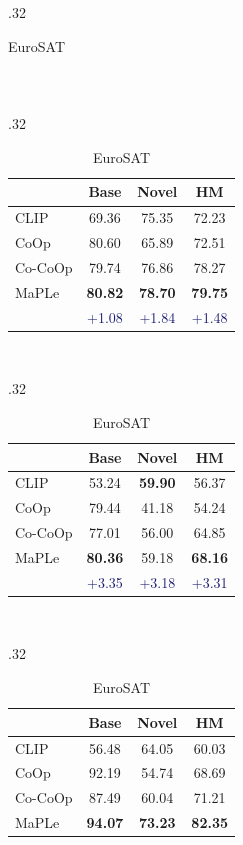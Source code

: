 \documentclass[10pt,twocolumn,letterpaper]{article}
\begin{document}
\begin{table}[t!]
\begin{subtable}[t]{.32\textwidth}
\begin{tabular}{l cc|c}
    \end{tabular}
    \end{subtable}
    ~
    \begin{subtable}[t]{.32\textwidth}
    \centering
    \caption{SUN397}
    \begin{tabular}{l cc|c}
    \toprule
    & Base & Novel & HM \\
    \midrule
    CLIP & 69.36 & 75.35 & 72.23 \\
    CoOp & {80.60} & 65.89 & 72.51 \\
    Co-CoOp & 79.74 & {76.86} & {78.27} \\
    \midrule
        \rowcolor{tabhighlight}
    MaPLe & \textbf{80.82} & \textbf{78.70} & \textbf{79.75} \\
      &  \textcolor{MidnightBlue}{{+1.08}} &  \textcolor{MidnightBlue}{{+1.84}} &  \textcolor{MidnightBlue}{{+1.48}} \\
    \bottomrule
    \end{tabular}
    \end{subtable}
    ~
    \begin{subtable}[t]{.32\textwidth}
    \centering
    \caption{DTD}
    \begin{tabular}{l cc|c}
    \toprule
    & Base & Novel & HM \\
    \midrule
    CLIP & 53.24 & \textbf{59.90} & 56.37 \\
    CoOp & {79.44} & 41.18 & 54.24 \\
    Co-CoOp & 77.01 & 56.00 & {64.85} \\
    \midrule
        \rowcolor{tabhighlight}
    MaPLe & \textbf{80.36} & 59.18 & \textbf{68.16} \\
      &  \textcolor{MidnightBlue}{{+3.35}} &  \textcolor{MidnightBlue}{{+3.18}} &  \textcolor{MidnightBlue}{{+3.31}} \\
    \bottomrule
    \end{tabular}
    \end{subtable}
    ~
    \begin{subtable}[t]{.32\textwidth}
    \centering
    \caption{EuroSAT}
    \begin{tabular}{l cc|c}
    \toprule
    & Base & Novel & HM \\
    \midrule
    CLIP & 56.48 & {64.05} & 60.03 \\
    CoOp & {92.19} & 54.74 & 68.69 \\
    Co-CoOp & 87.49 & 60.04 & {71.21} \\
    \midrule
        \rowcolor{tabhighlight}
    MaPLe & \textbf{94.07} & \textbf{73.23} & \textbf{82.35} \\

\end{tabular}
\end{subtable}
\end{table}
\end{document}
